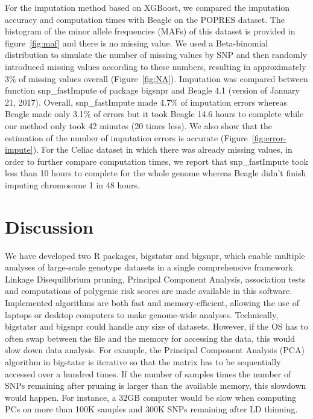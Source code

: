 \documentclass{bioinfo}
\begin{document}
For the imputation method based on XGBoost, we compared  the imputation accuracy and computation times with Beagle on the POPRES dataset. The histogram of the minor allele frequencies (MAFs) of this dataset is provided in figure~\ref{fig:maf} and there is no missing value. 
We used a Beta-binomial distribution to simulate the number of missing values by SNP and then randomly introduced missing values according to these numbers, resulting in approximately 3\% of missing values overall (Figure~\ref{fig:NA}). Imputation was compared between function snp\_fastImpute of package bigsnpr and Beagle 4.1 (version of January 21, 2017). Overall, snp\_fastImpute made 4.7\% of imputation errors whereas Beagle made only 3.1\% of errors but it took Beagle 14.6 hours to complete while our method only took 42 minutes (20 times less). 
We also show that the estimation of the number of imputation errors is accurate (Figure~\ref{fig:error-impute}).
For the Celiac dataset in which there was already missing values, in order to further compare computation times, we report that snp\_fastImpute took less than 10 hours to complete for the whole genome whereas Beagle didn't finish imputing chromosome 1 in 48 hours. 



\section{Discussion}

We have developed two R packages, bigstatsr and bigsnpr, which enable multiple analyses of large-scale genotype datasets in a single comprehensive framework. Linkage Disequilibrium pruning, Principal Component Analysis, association tests and computations of polygenic risk scores are made available in this software. Implemented algorithms are both fast and memory-efficient, allowing the use of laptops or desktop computers to make genome-wide analyses. 
Technically, bigstatsr and bigsnpr could handle any size of datasets. However, if the OS has to often swap between the file and the memory for accessing the data, this would slow down data analysis. For example, the Principal Component Analysis (PCA) algorithm in bigstatsr is iterative so that the matrix has to be sequentially accessed over a hundred times. If the number of samples times the number of SNPs remaining after pruning is larger than the available memory, this slowdown would happen. For instance, a 32GB computer would be slow when computing PCs on more than 100K samples and 300K SNPs remaining after LD thinning.
\end{document}
